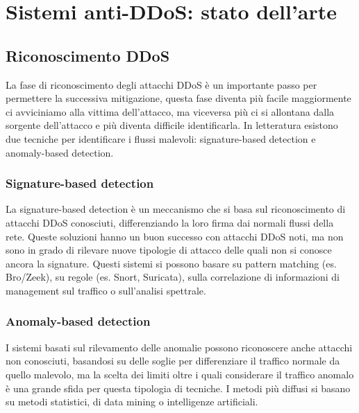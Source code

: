 
\chapter{Sistemi anti-DDoS: stato dell'arte}


\section{Riconoscimento DDoS}

La fase di riconoscimento degli attacchi DDoS è un importante passo per permettere la successiva mitigazione, questa fase diventa più facile maggiormente ci avviciniamo alla vittima dell'attacco, ma viceversa più ci si allontana dalla sorgente dell'attacco e più diventa difficile identificarla. In letteratura esistono due tecniche per identificare i flussi malevoli: signature-based detection e anomaly-based detection.

\subsection{Signature-based detection}

La signature-based detection è un meccanismo che si basa sul riconoscimento di attacchi DDoS conosciuti, differenziando la loro firma dai normali flussi della rete. Queste soluzioni hanno un buon successo con attacchi DDoS noti, ma non sono in grado di rilevare nuove tipologie di attacco delle quali non si conosce ancora la signature. Questi sistemi si possono basare su pattern matching (es. Bro/Zeek), su regole (es. Snort, Suricata), sulla correlazione di informazioni di management sul traffico o sull'analisi spettrale.

\subsection{Anomaly-based detection}

I sistemi basati sul rilevamento delle anomalie possono riconoscere anche attacchi non conosciuti, basandosi su delle soglie per differenziare il traffico normale da quello malevolo, ma la scelta dei limiti oltre i quali considerare il traffico anomalo è una grande sfida per questa tipologia di tecniche.
I metodi più diffusi si basano su metodi statistici, di data mining o intelligenze artificiali.

